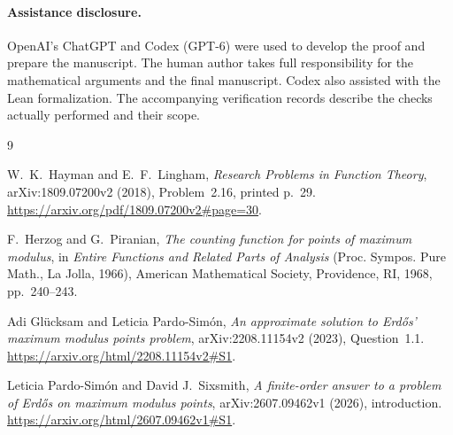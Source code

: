 \documentclass[11pt]{article}
\numberwithin{equation}{section}
\begin{document}
\paragraph{Assistance disclosure.}
OpenAI's ChatGPT and Codex (GPT-6) were used to develop the proof and
prepare the manuscript. The human author takes full responsibility for
the mathematical arguments and the final manuscript.
Codex also assisted with the Lean formalization.
The accompanying verification records describe the checks actually
performed and their scope.

\begin{thebibliography}{9}
\raggedright

W.~K.~Hayman and E.~F.~Lingham,
\emph{Research Problems in Function Theory},
arXiv:1809.07200v2 (2018), Problem~2.16, printed p.~29.
\url{https://arxiv.org/pdf/1809.07200v2#page=30}.

F.~Herzog and G.~Piranian,
\emph{The counting function for points of maximum modulus},
in \emph{Entire Functions and Related Parts of Analysis}
(Proc. Sympos. Pure Math., La Jolla, 1966),
American Mathematical Society, Providence, RI, 1968, pp.~240--243.

Adi Gl\"ucksam and Leticia Pardo-Sim\'on,
\emph{An approximate solution to Erd\H{o}s' maximum modulus points problem},
arXiv:2208.11154v2 (2023), Question~1.1.
\url{https://arxiv.org/html/2208.11154v2#S1}.

Leticia Pardo-Sim\'on and David J.~Sixsmith,
\emph{A finite-order answer to a problem of Erd\H{o}s on maximum modulus points},
arXiv:2607.09462v1 (2026), introduction.
\url{https://arxiv.org/html/2607.09462v1#S1}.

\end{thebibliography}
\end{document}
